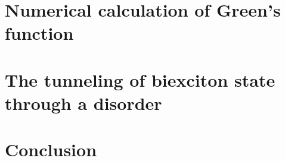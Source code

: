 \section{Numerical calculation of Green's function}
\label{sec:numericGreen}

\section{The tunneling of biexciton state through a disorder}
\label{sec:biexcitonTunneling}

\section{Conclusion}
\label{sec:conclusionGreenFunc}
